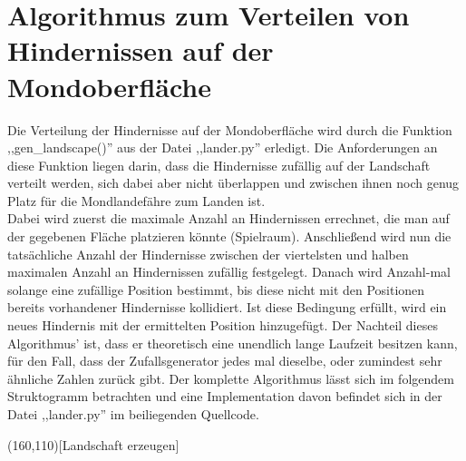 \documentclass[hidelinks]{article}
\begin{document}
\section{Algorithmus zum Verteilen von Hindernissen auf der Mondoberfläche}
Die Verteilung der Hindernisse auf der Mondoberfläche wird durch die Funktion ,,gen\_landscape()'' aus der Datei ,,lander.py'' erledigt. Die Anforderungen an diese Funktion liegen darin, dass die Hindernisse zufällig auf der Landschaft verteilt werden, sich dabei aber nicht überlappen und zwischen ihnen noch genug Platz für die Mondlandefähre zum Landen ist.\\
Dabei wird zuerst die maximale Anzahl an Hindernissen errechnet, die man auf der gegebenen Fläche platzieren könnte (Spielraum). Anschließend wird nun die tatsächliche Anzahl der Hindernisse zwischen der viertelsten und halben maximalen Anzahl an Hindernissen zufällig festgelegt. Danach wird Anzahl-mal solange eine zufällige Position bestimmt, bis diese nicht mit den Positionen bereits vorhandener Hindernisse kollidiert. Ist diese Bedingung erfüllt, wird ein neues Hindernis mit der ermittelten Position hinzugefügt. Der Nachteil dieses Algorithmus' ist, dass er theoretisch eine unendlich lange Laufzeit besitzen kann, für den Fall, dass der Zufallsgenerator jedes mal dieselbe, oder zumindest sehr ähnliche Zahlen zurück gibt. Der komplette Algorithmus lässt sich im folgendem Struktogramm betrachten und eine Implementation davon befindet sich in der Datei ,,lander.py'' im beiliegenden Quellcode.\\

\begin{struktogramm}(160,110)[Landschaft erzeugen]
        \change
        \ifend
      \whileend
    \whileend
  \whileend
\end{struktogramm}
\end{document}
